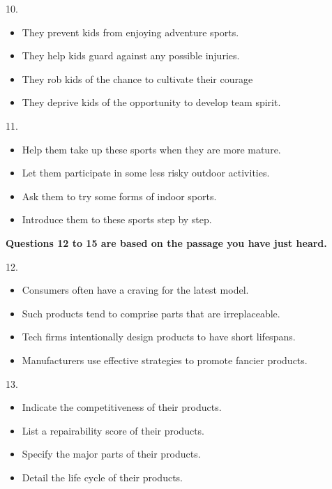 \documentclass[UTF8,11pt]{ctexart}
\begin{document}
10.


\begin{itemize}[leftmargin=2em,itemsep=.2em,topsep=.4em]\item[A.] They prevent kids from enjoying adventure sports.
\item[B.] They help kids guard against any possible injuries.
\item[C.] They rob kids of the chance to cultivate their courage
\item[D.] They deprive kids of the opportunity to develop team spirit.
\end{itemize}

11.


\begin{itemize}[leftmargin=2em,itemsep=.2em,topsep=.4em]\item[A.] Help them take up these sports when they are more mature.
\item[B.] Let them participate in some less risky outdoor activities.
\item[C.] Ask them to try some forms of indoor sports.
\item[D.] Introduce them to these sports step by step.
\end{itemize}

\textbf{Questions 12 to 15 are based on the passage you have just heard.}


12.


\begin{itemize}[leftmargin=2em,itemsep=.2em,topsep=.4em]\item[A.] Consumers often have a craving for the latest model.
\item[B.] Such products tend to comprise parts that are irreplaceable.
\item[C.] Tech firms intentionally design products to have short lifespans.
\item[D.] Manufacturers use effective strategies to promote fancier products.
\end{itemize}

13.


\begin{itemize}[leftmargin=2em,itemsep=.2em,topsep=.4em]\item[A.] Indicate the competitiveness of their products.
\item[B.] List a repairability score of their products.
\item[C.] Specify the major parts of their products.
\item[D.] Detail the life cycle of their products.
\end{itemize}
\end{document}
